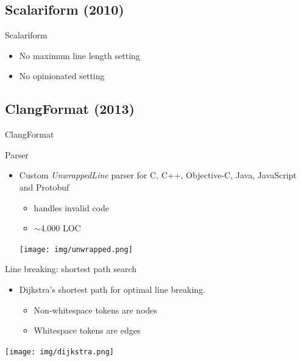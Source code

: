 \documentclass[xcolor=dvipsnames]{beamer}
\theoremstyle{definition}
\begin{document}
\subsection{Scalariform (2010)}

\begin{frame}{Scalariform}
  \begin{itemize}
    \item No maximum line length setting
    \item No opinionated setting
  \end{itemize}
\end{frame}

\subsection{ClangFormat (2013)}

\begin{frame}{}
  \begin{center}
    \Huge ClangFormat%
  \end{center}
\end{frame}
\begin{frame}{Parser}
  \begin{itemize}
    \item Custom \emph{UnwrappedLine} parser for C, C++, Objective-C, Java,
      JavaScript and Protobuf
      \begin{itemize}
        \item handles invalid code
        \item $\sim$4.000 LOC
      \end{itemize}
      \begin{center}
        \texttt{[image: img/unwrapped.png]}
      \end{center}
  \end{itemize}
\end{frame}

\begin{frame}{Line breaking: shortest path search}
  \begin{itemize}
    \item Dijkstra's shortest path for optimal line breaking.
      \begin{itemize}
        \item Non-whitespace tokens are nodes
        \item Whitespace tokens are edges
      \end{itemize}
  \end{itemize}
  \begin{center}
    \texttt{[image: img/dijkstra.png]}
  \end{center}
\end{frame}
\end{document}
